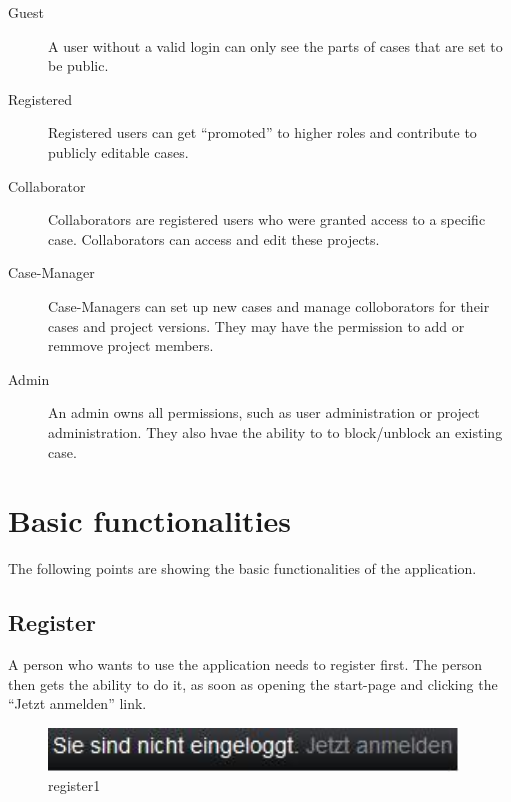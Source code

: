 \begin{description}
\item[Guest]
A user without a valid login can only see the parts of cases that are set to be public.
\item[Registered]
Registered users can get \enquote{promoted} to higher roles and contribute to publicly editable cases.
\item[Collaborator]
Collaborators are registered users who were granted access to a specific case. Collaborators can access and edit these projects.
\item[Case-Manager]
Case-Managers can set up new cases and manage colloborators for their cases and project versions. They may have the permission to add or remmove project members.
\item[Admin]
An admin owns all permissions, such as user administration or project administration. They also hvae the ability to to block/unblock an existing case.
\end{description}

\section{Basic functionalities}

The following points are showing the basic functionalities of the application.

\subsection{Register}

A person who wants to use the application needs to register first. The person then gets the ability to do it, as soon as opening the start-page and clicking the \enquote{Jetzt anmelden} link.

\begin{figure}[!ht]
  \centering
    \includegraphics[width=0.97\textwidth]{images/basic_functionalities/reg1.jpg}
  \caption{register1}
  \label{fig:register1}
\end{figure}

